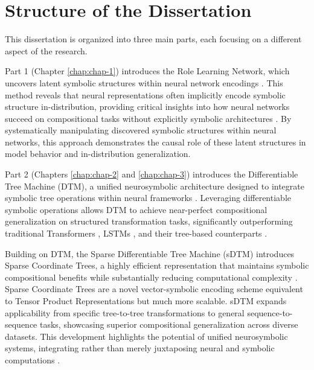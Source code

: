 
\section{Structure of the Dissertation}
This dissertation is organized into three main parts, each focusing on a different aspect of the research. 

Part 1 (Chapter \ref{chap:chap-1}) introduces the Role Learning Network, which uncovers latent symbolic structures within neural network encodings \citep{soulos-etal-2020-discovering}. This method reveals that neural representations often implicitly encode symbolic structure in-distribution, providing critical insights into how neural networks succeed on compositional tasks without explicitly symbolic architectures \citep{mccoy2018rnns}. By systematically manipulating discovered symbolic structures within neural networks, this approach demonstrates the causal role of these latent structures in model behavior and in-distribution generalization. 

Part 2 (Chapters \ref{chap:chap-2} and \ref{chap:chap-3}) introduces the Differentiable Tree Machine (DTM), a unified neurosymbolic architecture designed to integrate symbolic tree operations within neural frameworks \citep{pmlr-v202-soulos23a,soulos2024compositional}. Leveraging differentiable symbolic operations allows DTM to achieve near-perfect compositional generalization on structured transformation tasks, significantly outperforming traditional Transformers \citep{vaswani2017attention}, LSTMs \citep{hochreiter_long_1997}, and their tree-based counterparts \citep{tai-etal-2015-improved,dong2016language,NEURIPS2018_d759175d,shiv_novel_2019}.

Building on DTM, the Sparse Differentiable Tree Machine (sDTM) introduces Sparse Coordinate Trees, a highly efficient representation that maintains symbolic compositional benefits while substantially reducing computational complexity \citep{soulos2024compositional}. Sparse Coordinate Trees are a novel vector-symbolic encoding scheme equivalent to Tensor Product Representations but much more scalable. sDTM expands applicability from specific tree-to-tree transformations to general sequence-to-sequence tasks, showcasing superior compositional generalization across diverse datasets. This development highlights the potential of unified neurosymbolic systems, integrating rather than merely juxtaposing neural and symbolic computations \citep{gayler2003vsa_jackendoff,smolensky_tensor_1990}.

